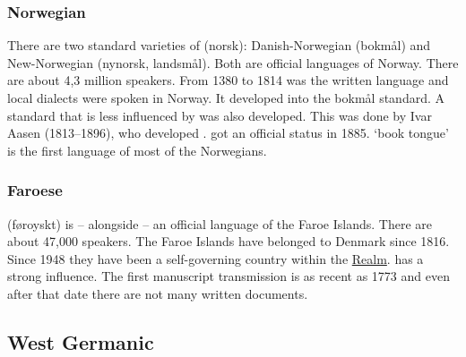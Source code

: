 \subsubsection{Norwegian}

\largerpage
There are two standard varieties of  (norsk): Danish-Norwegian (bokmål) and New-Norwegian (nynorsk, landsmål). 
Both are official languages of Norway.
There are about 4,3 million speakers.
From 1380 to 1814  was the written language and local dialects were spoken in Norway. It developed into the bokmål standard.
A standard that is less influenced by  was also developed. This was done by Ivar Aasen (1813--1896), 
who developed .  got an official status in 1885.  `book tongue' is the first language of most
of the Norwegians.

\subsubsection{Faroese}

 (føroyskt) is -- alongside  -- an official language of the Faroe Islands. There
are about 47,000 speakers. The Faroe Islands have belonged to Denmark since 1816. Since 1948 they
have been a self-governing country within the \href{https://en.wikipedia.org/wiki/Danish_Realm}{ Realm}.
 has a strong  influence. The first manuscript transmission is as recent as 1773 and
even after that date there are not many written documents.%

\subsection{West Germanic}


